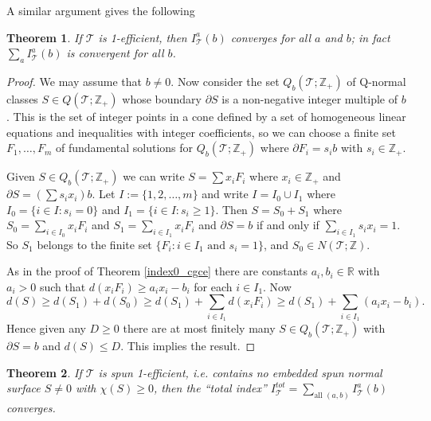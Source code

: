 \documentclass[12pt,reqno]{amsart}  %
\newtheorem{thm}{Theorem}[section]
\theoremstyle{definition}
\theoremstyle{remark}
\def\R{\mathbb{R}}
\newcommand{\T}{\mathcal{T}}
\def\Z{\mathbb Z}
\def\bd{\partial}
\begin{document}
A similar argument gives the following

\begin{thm} 
\label{1-eff_cgce_I_T(b)}
If $\T$ is 1-efficient, then $I_\T^a(b)$ converges for all $a$ and $b$; 
in fact $\sum_a I_\T^a(b)$ is convergent for all $b$.
\end{thm}

\begin{proof} 
We may assume that  $b \ne 0$. Now consider  the set $Q_b(\T;\Z_+)$ of 
Q-normal classes $S \in Q(\T;\Z_+)$ whose boundary $\bd S$ is a 
non-negative integer multiple of $b$. This is the set of integer points 
in a cone defined by a set of homogeneous linear equations and inequalities 
with integer coefficients, so we can choose a finite set $F_1, \ldots, F_m$  
of fundamental solutions for $Q_b(\T;\Z_+)$ where $\bd F_i = s_i b$ with 
$s_i \in \Z_+$.

Given $S \in Q_b(\T;\Z_+)$ we can write $S = \sum x_i F_i$ where 
$x_i \in \Z_+$ and  $\bd S = (\sum s_i x_i )b$.
Let $I:=\{1,2,\ldots,m\}$ and write  $I= I_0  \cup I_1$ where 
$I_0 = \{ i \in I : s_i=0 \}$ and $I_1 = \{ i \in I : s_i \ge 1 \}$.
Then $S = S_0 + S_1$ where $S_0 = \sum_{i \in I_0} x_i F_i$ and 
$S_1 = \sum_{i \in I_1} x_i F_i$ and $\bd S = b$ if and only if 
$\sum_{i \in I_1} s_i x_i = 1$. So $S_1$ belongs to the finite set 
$\{ F_i : i \in I_1 \text{ and } s_i=1\}$, and $S_0 \in  N(\T;\Z)$. 

As in the proof of Theorem \ref {index0_cgce} there are constants 
$a_i,b_i  \in \R$ with $a_i >0$ such that $d(x_i F_i) \ge a_i x_i - b_i$ for 
each $i \in I_1$. Now
$$
d(S) \ge d(S_1)+d(S_0) \ge d(S_1) + \sum_{i \in I_1} d(x_i F_i) \ge 
d(S_1) + \sum_{i \in I_1}(a_i x_i - b_i).
$$
Hence given any $D \ge 0$ there are at most finitely many 
$S \in Q_b(\T;\Z_+)$ with $\bd S = b$ and  $d(S) \le D$. 
This implies the result.
\end{proof}

\begin{thm}
If $\T$ is {\em spun 1-efficient}, i.e. contains no embedded spun normal 
surface $S\ne 0$ with $\chi(S)\ge 0$, then the ``total index'' 
$I^{tot}_\T = \sum_{\text{all } (a,b)}  I_\T^a(b)$ converges.
\end{thm}
\end{document}
